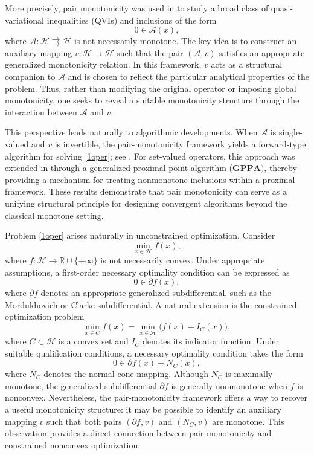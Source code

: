 \documentclass[11pt]{article}
\theoremstyle{definition}
\theoremstyle{definition}
\theoremstyle{definition}
\begin{document}
More precisely, pair monotonicity was used in \cite{acl} to study a broad class of quasi-variational inequalities (QVIs) and inclusions of the form
\begin{equation}\label{1oper}
0\in\mathcal{A}(x),
\end{equation}
where $\mathcal{A}:\mathcal{H}\rightrightarrows\mathcal{H}$ is not necessarily monotone. The key idea is to construct an auxiliary mapping $v:\mathcal{H}\to\mathcal{H}$ such that the pair $(\mathcal{A},v)$ satisfies an appropriate generalized monotonicity relation. In this framework, $v$ acts as a structural companion to $\mathcal{A}$ and is chosen to reflect the particular analytical properties of the problem. Thus, rather than modifying the original operator or imposing global monotonicity, one seeks to reveal a suitable monotonicity structure through the interaction between $\mathcal{A}$ and $v$.

This perspective leads naturally to algorithmic developments. When $\mathcal{A}$ is single-valued and $v$ is invertible, the pair-monotonicity framework yields a forward-type algorithm for solving \eqref{1oper}; see \cite{acl}. For set-valued operators, this approach was extended in \cite{LDT} through a generalized proximal point algorithm ($\mathbf{GPPA})$, thereby providing a mechanism for treating nonmonotone inclusions within a proximal framework. These results demonstrate that pair monotonicity can serve as a unifying structural principle for designing convergent algorithms beyond the classical monotone setting.





Problem \eqref{1oper} arises naturally in unconstrained optimization. Consider
$$
\min_{x\in\mathcal{H}} f(x),
$$
where $f:\mathcal{H}\to\mathbb{R}\cup\{+\infty\}$ is not necessarily convex. Under appropriate assumptions, a first-order necessary optimality condition can be expressed as
$$
0\in\partial f(x),
$$
where $\partial f$ denotes an appropriate generalized subdifferential, such as the Mordukhovich or Clarke subdifferential. A natural extension is the constrained optimization problem
$$
\min_{x\in C} f(x)
=\min_{x\in\mathcal{H}}\bigl(f(x)+I_C(x)\bigr),
$$
where $C\subset\mathcal{H}$ is a convex set and $I_C$ denotes its indicator function. Under suitable qualification conditions, a necessary optimality condition takes the form
\begin{equation}\label{constr}
0\in\partial f(x)+N_C(x),
\end{equation}
where $N_C$ denotes the normal cone mapping. Although $N_C$ is maximally monotone, the generalized subdifferential $\partial f$ is generally nonmonotone when $f$ is nonconvex. Nevertheless, the pair-monotonicity framework offers a way to recover a useful monotonicity structure: it may be possible to identify an auxiliary mapping $v$ such that both pairs $(\partial f,v)$ and $(N_C,v)$ are monotone. This observation provides a direct connection between pair monotonicity and constrained nonconvex optimization.
\end{document}
